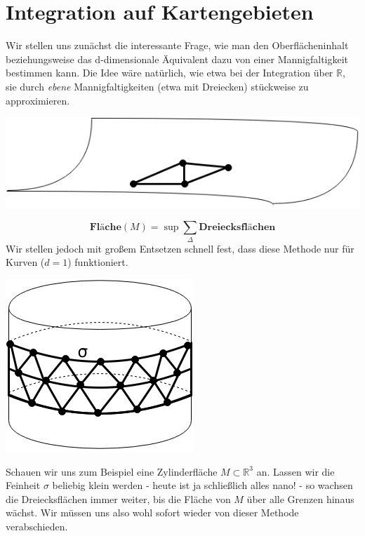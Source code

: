 \section{Integration auf Kartengebieten}
\setcounter{equation}{0}     %
Wir stellen uns zunächst die interessante Frage, wie man den Oberflächeninhalt beziehungsweise das d-dimensionale Äquivalent dazu von einer Mannigfaltigkeit bestimmen kann. 
Die Idee wäre natürlich, wie etwa bei der Integration über $\mathbb{R}$, sie durch \emph{ebene} Mannigfaltigkeiten (etwa mit Dreiecken) stückweise zu approximieren.\\
\begin{center}
	\includegraphics[scale=0.5]{pictures/003-03.png}
\end{center}
\begin{equation*}
\textbf{Fläche}(M)=\sup \sum\limits_\Delta \textbf{Dreiecksflächen}
\end{equation*}
Wir stellen jedoch mit großem Entsetzen schnell fest, dass diese Methode nur für Kurven ($d=1$) funktioniert.\\
\begin{center}
	\includegraphics[scale=0.5]{pictures/003-04.png}
\end{center}
Schauen wir uns zum Beispiel eine Zylinderfläche $M\subset\mathbb{R}^3$ an. 
Lassen wir die Feinheit $\sigma$ beliebig klein werden - heute ist ja schließlich alles nano! - so wachsen die Dreiecksflächen immer weiter, 
bis die Fläche von $M$ über alle Grenzen hinaus wächst. Wir müssen uns also wohl sofort wieder von dieser Methode verabschieden.\\
